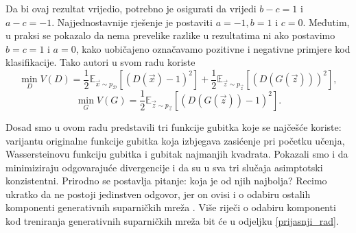 Da bi ovaj rezultat vrijedio, potrebno je osigurati da vrijedi $b - c = 1$ i $a - c = -1$. Najjednostavnije rješenje je postaviti $a = -1, b = 1$ i $c = 0$. Međutim, u praksi se pokazalo da nema prevelike razlike u rezultatima ni ako postavimo $b = c = 1$ i $a = 0$, kako uobičajeno označavamo pozitivne i negativne primjere kod klasifikacije. Tako autori  u svom radu koriste 
\begin{equation*}
\min_D V(D) = \frac{1}{2}\mathbb{E}_{\vec{x} \sim p_{\mathcal{D}}}\left[(D(\vec{x}) - 1)^2\right] + \frac{1}{2}\mathbb{E}_{\vec{z} \sim p_{\vec{z}}}\left[(D(G(\vec{z})))^2\right],
\end{equation*}
\begin{equation*}
\min_G V(G) = \frac{1}{2}\mathbb{E}_{\vec{z} \sim p_{\vec{z}}}\left[(D(G(\vec{z})) - 1)^2\right].
\end{equation*}


Dosad smo u ovom radu predstavili tri funkcije gubitka koje se najčešće koriste: varijantu originalne funkcije gubitka koja izbjegava zasićenje pri početku učenja, Wassersteinovu funkciju gubitka i gubitak najmanjih kvadrata. Pokazali smo i da minimiziraju odgovarajuće divergencije i da su u sva tri slučaja asimptotski konzistentni. Prirodno se postavlja pitanje: koja je od njih najbolja? Recimo ukratko da ne postoji jedinstven odgovor, jer on ovisi i o odabiru ostalih komponenti generativnih suparničkih mreža . Više riječi o odabiru komponenti kod treniranja generativnih suparničkih mreža bit će u odjeljku \ref{prijasnji_rad}. 